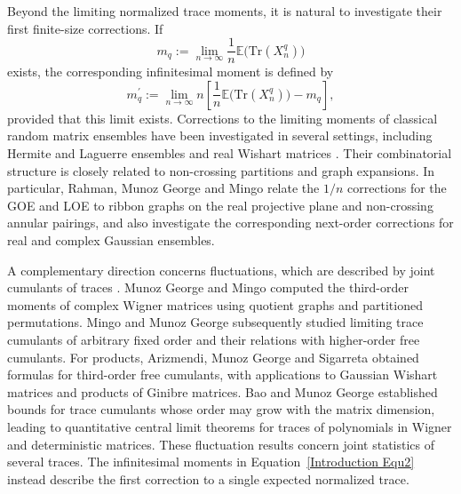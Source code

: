 \documentclass{article}
\theoremstyle{definition}
\newcommand{\Tr}{\text{Tr}}
\begin{document}
Beyond the limiting normalized trace moments, it is natural to
investigate their first finite-size corrections. If
\begin{equation}\label{Equation: Moments of random matrix}
m_q := \lim_{n\to\infty}
\frac{1}{n}\mathbb{E}\bigl(\Tr(X_n^q)\bigr)
\end{equation}
exists, the corresponding infinitesimal moment is defined by
\begin{equation}\label{Introduction Equ2}
m_q^\prime :=
\lim_{n\to\infty}
n\left[
\frac{1}{n}\mathbb{E}\bigl(\Tr(X_n^q)\bigr)-m_q
\right],
\end{equation}
provided that this limit exists.
Corrections to the limiting moments of classical random matrix
ensembles have been investigated in several settings, including
Hermite and Laguerre ensembles and real Wishart matrices
\cite{J,DE2,Mingo19,MV}.
Their combinatorial structure is closely related to non-crossing
partitions and graph expansions.
In particular, Rahman, Munoz George and Mingo \cite{RMM25}
relate the $1/n$ corrections for the GOE and LOE to ribbon graphs
on the real projective plane and non-crossing annular pairings,
and also investigate the corresponding next-order corrections
for real and complex Gaussian ensembles.

A complementary direction concerns fluctuations, which are
described by joint cumulants of traces
\cite{MN,MS07}.
Munoz George and Mingo \cite{MGM22} computed the third-order
moments of complex Wigner matrices using quotient graphs and
partitioned permutations.
Mingo and Munoz George \cite{MMG24} subsequently studied
limiting trace cumulants of arbitrary fixed order and their
relations with higher-order free cumulants.
For products, Arizmendi, Munoz George and Sigarreta
\cite{AMGS25} obtained formulas for third-order free cumulants,
with applications to Gaussian Wishart matrices and products
of Ginibre matrices.
Bao and Munoz George \cite{BMG25} established bounds for
trace cumulants whose order may grow with the matrix dimension,
leading to quantitative central limit theorems for traces of
polynomials in Wigner and deterministic matrices.
These fluctuation results concern joint statistics of several
traces. The infinitesimal moments in
Equation~\ref{Introduction Equ2} instead describe the first
correction to a single expected normalized trace.
\end{document}
